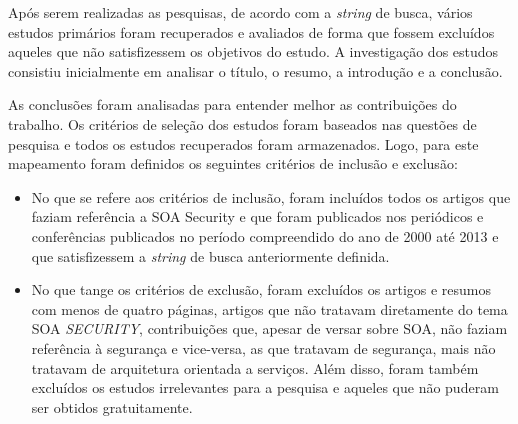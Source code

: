 Após serem realizadas as pesquisas, de acordo com a \emph{string} de busca,  vários estudos primários foram recuperados e avaliados  de forma que fossem  excluídos aqueles que não satisfizessem os objetivos do estudo. A investigação dos estudos consistiu inicialmente em analisar o título, o resumo, a introdução e a conclusão.

As conclusões foram analisadas para entender melhor as contribuições do trabalho. Os critérios de seleção dos estudos foram baseados nas questões de pesquisa e todos os estudos recuperados foram armazenados. Logo, para este mapeamento foram definidos os seguintes critérios de inclusão e exclusão:
\begin{itemize}
\item No que se refere aos critérios de inclusão, foram incluídos todos os artigos que faziam referência a SOA Security e que foram publicados nos periódicos e conferências publicados no período compreendido do ano de 2000 até 2013 e que satisfizessem a \emph{string} de busca anteriormente definida.

\item No que tange os critérios de exclusão, foram excluídos os artigos e resumos com menos de quatro páginas, artigos que não tratavam diretamente do tema SOA \emph{SECURITY}, contribuições que, apesar de versar sobre SOA, não faziam referência à segurança e vice-versa, as que tratavam de segurança, mais não tratavam de arquitetura orientada a serviços. Além disso, foram também excluídos os estudos irrelevantes para a pesquisa e aqueles que não puderam ser obtidos gratuitamente.
\end{itemize}



